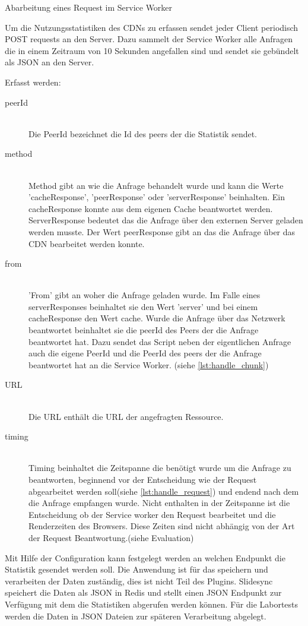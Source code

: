 \begin{description}
\begin{listing}[h]
	\inputminted{javascript}{listings/handle_request.js}
	\caption{Abarbeitung eines Request im Service Worker}
	\label{lst:handle_request}
\end{listing}

Um die Nutzungsstatistiken des CDNs zu erfassen sendet jeder Client periodisch POST requests an den Server. Dazu sammelt der Service Worker alle Anfragen die in einem Zeitraum von 10 Sekunden angefallen sind und sendet sie gebündelt als JSON an den Server.

Erfasst werden:
\begin{description}
\item[peerId]\hfill \\
Die PeerId bezeichnet die Id des peers der die Statistik sendet.
\item[method]\hfill \\
Method gibt an wie die Anfrage behandelt wurde und kann die Werte 'cacheResponse', 'peerResponse' oder 'serverResponse' beinhalten. Ein cacheResponse konnte aus dem eigenen Cache beantwortet werden. ServerResponse bedeutet das die Anfrage über den externen Server geladen werden musste. Der Wert peerResponse gibt an das die Anfrage über das \pTp CDN bearbeitet werden konnte.
\item[from]\hfill \\
 'From' gibt an woher die Anfrage geladen wurde. Im Falle eines serverResponses beinhaltet sie den Wert 'server' und bei einem cacheResponse den Wert cache. Wurde die Anfrage über das \pTp Netzwerk beantwortet beinhaltet sie die peerId des Peers der die Anfrage beantwortet hat. Dazu sendet das Script neben der eigentlichen Anfrage auch die eigene PeerId und die PeerId des peers der die Anfrage beantwortet hat an die Service Worker. (siehe \ref{lst:handle_chunk}) 
\item[URL]\hfill \\
Die URL enthält die URL der angefragten Ressource. 
\item[timing]\hfill \\
Timing beinhaltet die Zeitspanne die benötigt wurde um die Anfrage zu beantworten, beginnend vor der Entscheidung wie der Request abgearbeitet werden soll(siehe \ref{lst:handle_request}) und endend nach dem die Anfrage empfangen wurde. Nicht enthalten in der Zeitspanne ist die Entscheidung ob der Service worker den Request bearbeitet und die Renderzeiten des Browsers. Diese Zeiten sind nicht abhängig von der Art der Request Beantwortung.(siehe Evaluation)
\end{description}
Mit Hilfe der Configuration kann festgelegt werden an welchen Endpunkt die Statistik gesendet werden soll. Die Anwendung ist für das speichern und verarbeiten der Daten zuständig, dies ist nicht Teil des Plugins. Slidesync speichert die Daten als JSON in Redis und stellt einen JSON Endpunkt zur Verfügung mit dem die Statistiken abgerufen werden können. Für die Labortests werden die Daten in JSON Dateien zur späteren Verarbeitung abgelegt.



\end{description}
